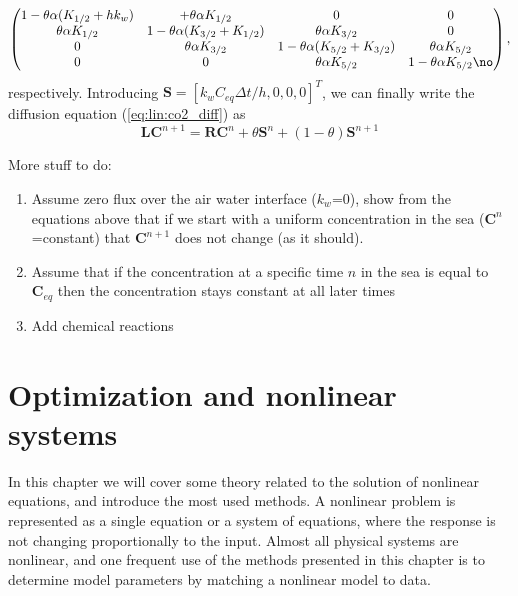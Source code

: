 \documentclass[graybox,sectrefs,envcountresetchap,open=right,final]{svmonodo}
\begin{document}
{\tiny
\begin{align}
\begin{pmatrix}
1-\theta\alpha(K_{1/2}+hk_w)&+\theta\alpha K_{1/2}&0&0\\ 
\theta\alpha K_{1/2}&1-\theta\alpha(K_{3/2}+K_{1/2})&\theta\alpha K_{3/2} &0\\ 
0&\theta\alpha K_{3/2}&1-\theta\alpha(K_{5/2}+K_{3/2})&\theta\alpha K_{5/2} \\ 
0&0&\theta\alpha K_{5/2}&1-\theta\alpha K_{5/2}\no
\end{pmatrix},
\end{align}
}
respectively. Introducing $\mathbf{S}=\left[k_wC_{eq}\Delta t/h,0,0,0\right]^T$, we can finally write the diffusion equation (\ref{eq:lin:co2_diff}) as
\begin{equation}
\mathbf{L}\mathbf{C}^{n+1}=\mathbf{R}\mathbf{C}^n+\theta\mathbf{S}^n+(1-\theta)\mathbf{S}^{n+1}
\label{eq:lin:discdif}
\end{equation}

More stuff to do:
\begin{enumerate}
\item Assume zero flux over the air water interface ($k_w$=0), show from the equations above that if we start with a uniform concentration in the sea ($\mathbf{C}^n$=constant) that $\mathbf{C}^{n+1}$ does not change (as it should).

\item Assume that if the concentration at a specific time $n$ in the sea is equal to $\mathbf{C}_{eq}$ then the concentration stays constant at all later times

\item Add chemical reactions
\end{enumerate}

\noindent
\chapter{Optimization and nonlinear systems}
\label{ch:nlin}

In this chapter we will cover some theory related to the solution of nonlinear equations, and introduce the most used methods. A nonlinear problem is represented as a single equation or a system of equations, where the response is not changing proportionally to the input.  Almost all physical systems are nonlinear, and one frequent use of the methods presented in this chapter is to determine model parameters by matching a nonlinear model to data. 
\end{document}
